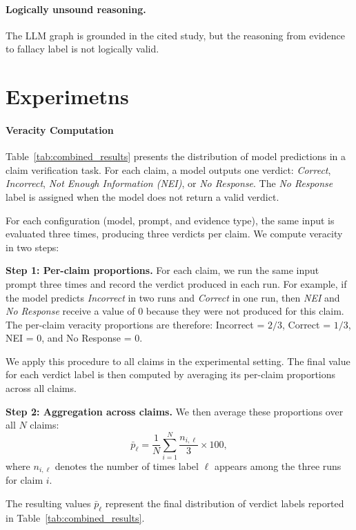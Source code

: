 \documentclass[11pt]{article}
\begin{document}
\paragraph{Logically unsound reasoning.}
The LLM graph is grounded in the cited study, but the reasoning from evidence to fallacy label is not logically valid.




\section{Experimetns}

\paragraph{Veracity Computation}
Table~\ref{tab:combined_results} presents the distribution of model predictions
in a claim verification task. For each claim, a model outputs one verdict:
\textit{Correct}, \textit{Incorrect}, \textit{Not Enough Information (NEI)}, or \textit{No Response}.
The \textit{No Response} label is assigned when the model does not return a valid verdict.

For each configuration (model, prompt, and evidence type), the same input is evaluated
three times, producing three verdicts per claim. We compute veracity in two steps:

\textbf{Step 1: Per-claim proportions.}
For each claim, we run the same input prompt three times and record the verdict produced in each run.
For example, if the model predicts \textit{Incorrect} in two runs and \textit{Correct} in one run,
then \textit{NEI} and \textit{No Response} receive a value of $0$ because they were not produced for this claim.
The per-claim veracity proportions are therefore: Incorrect = $2/3$, Correct = $1/3$, NEI = $0$, and No Response = $0$.

We apply this procedure to all claims in the experimental setting. The final value for each verdict label is then computed by averaging its per-claim proportions across all claims.  

\textbf{Step 2: Aggregation across claims.}
We then average these proportions over all $N$ claims:
\[
\bar{p}_{\ell} = \frac{1}{N} \sum_{i=1}^{N} \frac{n_{i,\ell}}{3} \times 100,
\]
where $n_{i,\ell}$ denotes the number of times label $\ell$ appears
among the three runs for claim $i$.

The resulting values $\bar{p}_{\ell}$ represent the final distribution of verdict labels
reported in Table~\ref{tab:combined_results}.
\end{document}
